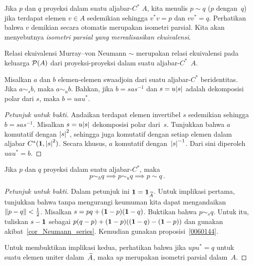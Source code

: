 \begin{notn} Jika $p$ dan $q$ proyeksi dalam suatu aljabar-$C^*$ $A$, kita menulis $p \sim q$
($p$  dengan~$q$) jika terdapat elemen $v \in A$
sedemikian sehingga $v^*v = p$ dan $vv^* = q$. Perhatikan bahwa $v$ demikian secara otomatis merupakan isometri
parsial. Kita akan menyebutnya
\emph{isometri parsial yang merealisasikan ekuivalensi}.
\end{notn}

\begin{prop}\label{0060216} Relasi ekuivalensi Murray--von Neumann $\sim$ merupakan
relasi ekuivalensi pada keluarga $\mathcal{P}(A)$ dari proyeksi-proyeksi dalam suatu aljabar-$C^*$~$A$.
\end{prop}

\begin{prop}\label{0060144} Misalkan $a$ dan $b$ elemen-elemen swaadjoin dari suatu aljabar-$C^*$ beridentitas. Jika $a \sim_s b$, maka $a \sim_u b$.
Bahkan, jika $b = sas^{-1}$ dan $s = u\lvert s\rvert$ adalah dekomposisi polar dari $s$, maka $b = uau^*$.
\end{prop}

\begin{proof}[\emph{Petunjuk untuk bukti}] Andaikan terdapat elemen invertibel $s$ sedemikian sehingga $b = sas^{-1}$. Misalkan $s = u\lvert s\rvert$
dekomposisi polar dari~$s$. Tunjukkan bahwa $a$ komutatif dengan ${\lvert s\rvert}^2$, sehingga juga komutatif dengan setiap elemen dalam aljabar $C^*(\mathbf{1},{\lvert s\rvert}^2)$.
Secara khusus, $a$ komutatif dengan~${\lvert s\rvert}^{-1}$. Dari sini diperoleh $uau^* = b$.   \ns
\end{proof}

\begin{prop}\label{0060221} Jika $p$ dan $q$ proyeksi dalam suatu aljabar-$C^*$, maka
   \[ p \sim_h q \implies p \sim_u q \implies p \sim q\,. \]
\end{prop}

\begin{proof}[\emph{Petunjuk untuk bukti}] Dalam petunjuk ini $\mathbf{1} = \mathbf{1}_{\widetilde{A}}$. Untuk implikasi pertama, tunjukkan bahwa tanpa mengurangi keumuman
kita dapat mengandaikan $\lVert p - q\rVert < \frac12$. Misalkan $s = pq + (\mathbf{1} - p)(\mathbf{1} - q)$. Buktikan bahwa $p \sim_s q$. Untuk
itu, tuliskan $s - \mathbf{1}$ sebagai $p(q - p) + (\mathbf{1} - p)((\mathbf{1} - q) - (\mathbf{1} - p))$ dan gunakan akibat~\ref{cor_Neumann_series}.
Kemudian gunakan proposisi~\ref{0060144}.

Untuk membuktikan implikasi kedua, perhatikan bahwa jika $upu^* = q$ untuk suatu elemen uniter dalam~$\widetilde{A}$, maka $up$ merupakan isometri parsial
dalam~$A$.  \ns
\end{proof}


